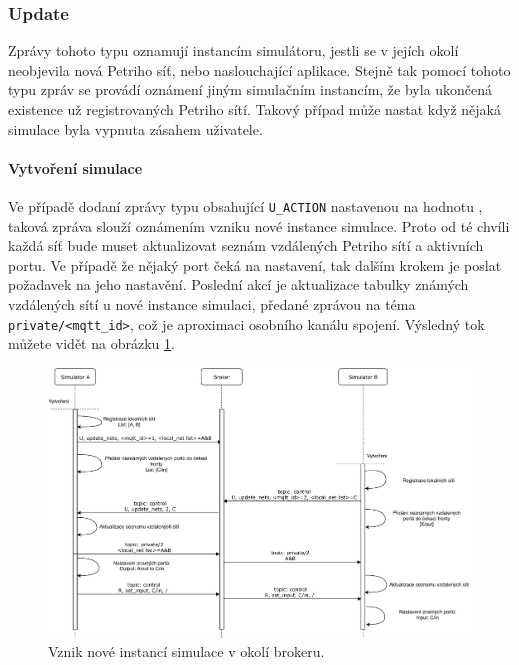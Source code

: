 \subsubsection{Update} Zprávy tohoto typu oznamují instancím simulátoru, jestli se v jejích okolí neobjevila nová Petriho síť, nebo naslouchající aplikace. Stejně tak pomocí tohoto typu zpráv se provádí oznámení jiným simulačním instancím, že byla ukončená existence už registrovaných Petriho sítí. Takový případ může nastat když nějaká simulace byla vypnuta zásahem uživatele.

\paragraph{Vytvoření simulace}

Ve případě dodaní zprávy typu  obsahující \texttt{U\_ACTION} nastavenou na hodnotu , taková zpráva slouží oznámením vzniku nové instance simulace. Proto od té chvíli každá síť bude muset aktualizovat seznám vzdálených Petriho sítí a aktivních portu. Ve případě že nějaký port čeká na nastavení, tak dalším krokem je poslat požadavek na jeho nastavění. Poslední akcí je aktualizace tabulky známých vzdálených sítí u nové instance simulaci, předané zprávou na téma \texttt{private/<mqtt\_id>}, což je aproximaci osobního kanálu spojení. Výsledný tok můžete vidět na obrázku \ref{sim-register-viz}.

\begin{figure}[hbt]
  \centering
  \includegraphics[width=1\textwidth]{obrazky-figures/sim-register.pdf}
  \caption{Vznik nové instancí simulace v okolí brokeru.}
  \label{sim-register-viz}
\end{figure}

